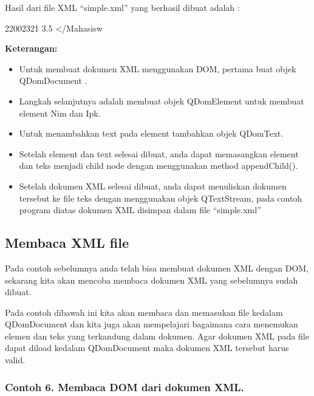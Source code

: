 Hasil dari file XML ``simple.xml'' yang berhasil dibuat adalah :

 22002321 3.5 \textless{}/Mahasisw

\textbf{Keterangan:}

\begin{itemize}

\item
  Untuk membuat dokumen XML menggunakan DOM, pertama buat objek
  QDomDocument .
\item
  Langkah selanjutnya adalah membuat objek QDomElement untuk membuat
  element Nim dan Ipk.
\item
  Untuk menambahkan text pada element tambahkan objek QDomText.
\item
  Setelah element dan text selesai dibuat, anda dapat memasangkan
  element dan teks menjadi child node dengan menggunakan method
  appendChild().
\item
  Setelah dokumen XML selesai dibuat, anda dapat menuliskan dokumen
  tersebut ke file teks dengan menggunakan objek QTextStream, pada
  contoh program diatas dokumen XML disimpan dalam file ``simple.xml''
\end{itemize}

\subsection{Membaca XML file}\label{membaca-xml-file}

Pada contoh sebelumnya anda telah bisa membuat dokumen XML dengan DOM,
sekarang kita akan mencoba membaca dokumen XML yang sebelumnya sudah
dibuat.

Pada contoh dibawah ini kita akan membaca dan memasukan file kedalam
QDomDocument dan kita juga akan mempelajari bagaimana cara menemukan
elemen dan teks yang terkandung dalam dokumen. Agar dokumen XML pada
file dapat diload kedalam QDomDocument maka dokumen XML tersebut harus
valid.

\subsubsection*{Contoh 6. Membaca DOM dari dokumen XML.}

